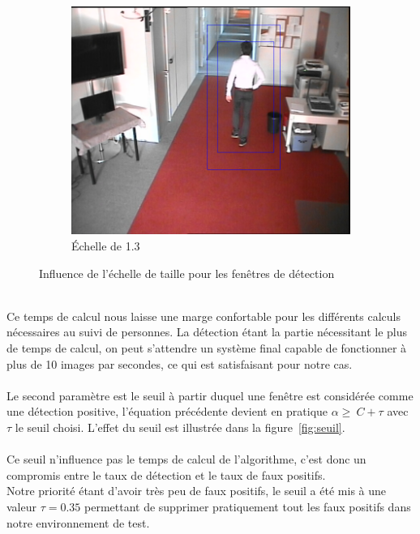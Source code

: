 \documentclass[12pt]{article}
\begin{document}
\begin{figure}[!ht]
	\begin{subfigure}{.3\textwidth}
		\centering
		\includegraphics[clip=true,trim=300 100 150 0,width=\linewidth]{img/multiscale13.png}
		\caption{Échelle de 1.3}
	\end{subfigure}
	\caption{Influence de l'échelle de taille pour les fenêtres de détection}
	\label{fig:multiscale}
\end{figure}\\
Ce temps de calcul nous laisse une marge confortable pour les différents calculs nécessaires au suivi de personnes. La détection étant la partie nécessitant le plus de temps de calcul, on peut s'attendre un système final capable de fonctionner à plus de 10 images par secondes, ce qui est satisfaisant pour notre cas.\\
\\
Le second paramètre est le seuil à partir duquel une fenêtre est considérée comme une détection positive, l'équation précédente devient en pratique $\alpha\geq~C+\tau$ avec $\tau$ le seuil choisi. L'effet du seuil est illustrée dans la figure~\ref{fig:seuil}.\\
\\
Ce seuil n'influence pas le temps de calcul de l'algorithme, c'est donc un compromis entre le taux de détection et le taux de faux positifs. \\Notre priorité étant d'avoir très peu de faux positifs, le seuil a été mis à une valeur $\tau=0.35$ permettant de supprimer pratiquement tout les faux positifs dans notre environnement de test.
\end{document}
